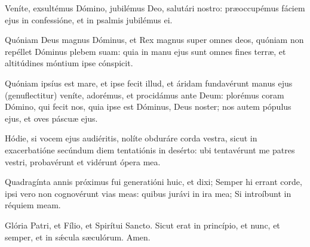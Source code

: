 \item Veníte, exsultémus Dómino, jubilémus Deo, salutári nostro: præoccupémus fáciem ejus in confessióne, et in psalmis jubilémus ei. 
\item Quóniam Deus magnus Dóminus, et Rex magnus super omnes deos, quóniam non repéllet Dóminus plebem suam: quia in manu ejus sunt omnes fines terræ, et altitúdines móntium ipse cónspicit. 
\item Quóniam ipsíus est mare, et ipse fecit illud, et áridam fundavérunt manus ejus (genuflectitur) veníte, adorémus, et procidámus ante Deum: plorémus coram Dómino, qui fecit nos, quia ipse est Dóminus, Deus noster; nos autem pópulus ejus, et oves páscuæ ejus. 
\item Hódie, si vocem ejus audiéritis, nolíte obduráre corda vestra, sicut in exacerbatióne secúndum diem tentatiónis in desérto: ubi tentavérunt me patres vestri, probavérunt et vidérunt ópera mea. 
\item Quadragínta annis próximus fui generatióni huic, et dixi; Semper hi errant corde, ipsi vero non cognovérunt vias meas: quibus jurávi in ira mea; Si introíbunt in réquiem meam. 
\item Glória Patri, et Fílio, et Spirítui Sancto. Sicut erat in princípio, et nunc, et semper, et in sǽcula sæculórum. Amen. 